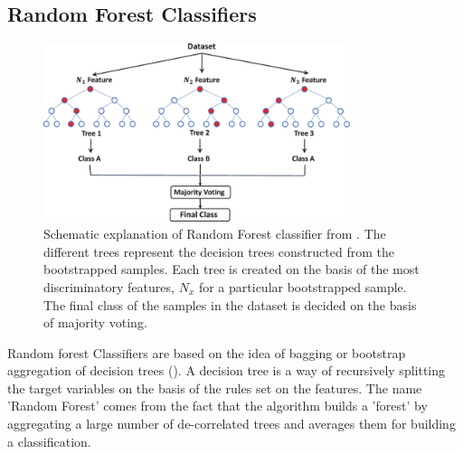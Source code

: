 \documentclass[msthesis.tex]{subfiles}
\begin{document}
\subsection{Random Forest Classifiers}
\begin{figure}
    \centering
    \includegraphics[width=0.8\textwidth]{images/Random_forest.png}
    \caption{Schematic explanation of Random Forest classifier from \cite{TAHMASEBI2020103619}. The different trees represent the decision trees constructed from the bootstrapped samples. Each tree is created on the basis of the most discriminatory features, $N_x$ for a particular bootstrapped sample. The final class of the samples in the dataset is decided on the basis of majority voting.}
    \label{fig:random_forests}
\end{figure}
Random forest Classifiers are based on the idea of bagging or bootstrap aggregation of decision trees (\cite{hastie2009elements}). A decision tree is a way of recursively splitting the target variables on the basis of the rules set on the features. The name 'Random Forest' comes from the fact that the algorithm builds a 'forest' by aggregating a large number of de-correlated trees and averages them for building a classification. 
\end{document}
